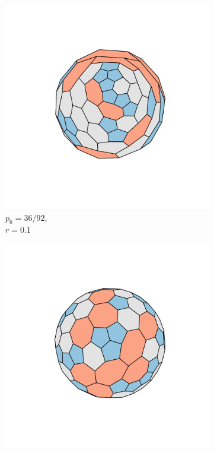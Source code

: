 \begin{figure}[bt]
     \begin{subfigure}[b]{0.22\textwidth}
         \centering
         \includegraphics[width=\textwidth]{./figures/general_networks/full92_r10.pdf}
         \caption{$p_6=36/92$,\\ $r=0.1$}
         \label{fig:fullerene92a}
     \end{subfigure}
     \hfill
     \begin{subfigure}[b]{0.2\textwidth}
         \centering
         \includegraphics[width=\textwidth]{./figures/general_networks/full92_r-10.pdf}

\end{subfigure}
\end{figure}
